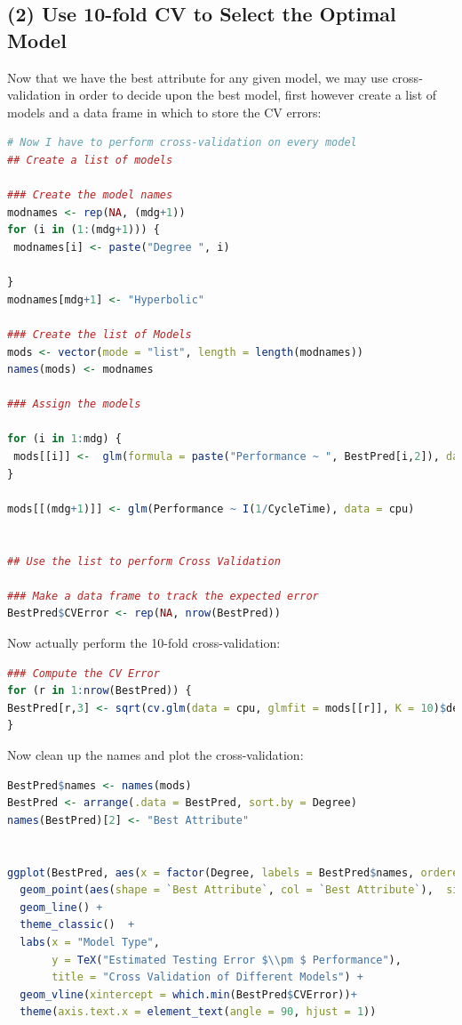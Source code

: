 \documentclass[
]{article}
\begin{document}
\hypertarget{use-10-fold-cv-to-select-the-optimal-model}{%
\subsection{(2) Use 10-fold CV to Select the Optimal
Model}\label{use-10-fold-cv-to-select-the-optimal-model}}

Now that we have the best attribute for any given model, we may use
cross-validation in order to decide upon the best model, first however
create a list of models and a data frame in which to store the CV
errors:

\begin{lstlisting}[language=R]
# Now I have to perform cross-validation on every model
## Create a list of models

### Create the model names
modnames <- rep(NA, (mdg+1))
for (i in (1:(mdg+1))) {
 modnames[i] <- paste("Degree ", i) 
  
}
modnames[mdg+1] <- "Hyperbolic"

### Create the list of Models
mods <- vector(mode = "list", length = length(modnames))
names(mods) <- modnames

### Assign the models

for (i in 1:mdg) {
 mods[[i]] <-  glm(formula = paste("Performance ~ ", BestPred[i,2]), data = cpu)
}

mods[[(mdg+1)]] <- glm(Performance ~ I(1/CycleTime), data = cpu)


## Use the list to perform Cross Validation

### Make a data frame to track the expected error
BestPred$CVError <- rep(NA, nrow(BestPred))
\end{lstlisting}

Now actually perform the 10-fold cross-validation:

\begin{lstlisting}[language=R]
### Compute the CV Error
for (r in 1:nrow(BestPred)) {
BestPred[r,3] <- sqrt(cv.glm(data = cpu, glmfit = mods[[r]], K = 10)$delta[1])
}
\end{lstlisting}

\newpage

Now clean up the names and plot the cross-validation:

\begin{lstlisting}[language=R]
BestPred$names <- names(mods)
BestPred <- arrange(.data = BestPred, sort.by = Degree)
names(BestPred)[2] <- "Best Attribute"


ggplot(BestPred, aes(x = factor(Degree, labels = BestPred$names, ordered = TRUE), y = CVError, group = 1)) + 
  geom_point(aes(shape = `Best Attribute`, col = `Best Attribute`),  size = 5) +
  geom_line() +
  theme_classic()  +
  labs(x = "Model Type",
       y = TeX("Estimated Testing Error $\\pm $ Performance"),
       title = "Cross Validation of Different Models") +
  geom_vline(xintercept = which.min(BestPred$CVError))+
  theme(axis.text.x = element_text(angle = 90, hjust = 1))
\end{lstlisting}
\end{document}
